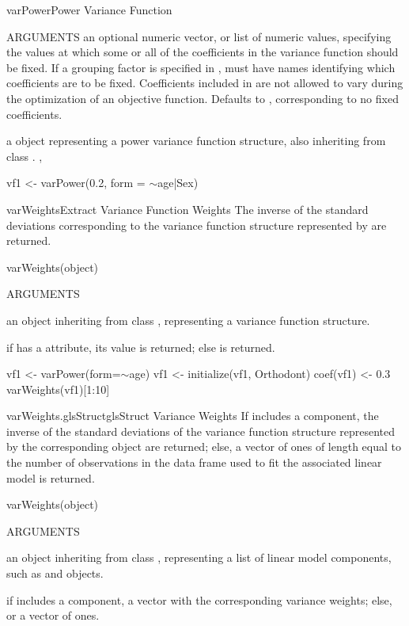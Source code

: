 \documentclass[pdftex]{article} \usepackage{url,graphicx}
\renewcommand{\Twiddle}{\mbox{\(\sim\)}}
\begin{document}
\begin{Helpfile}{varPower}{Power Variance Function}
\begin{Argument}{ARGUMENTS}
an optional numeric vector, or list of numeric values,
specifying the values at which some or all of the  coefficients in
the variance function should be fixed. If a grouping factor is
specified in ,  must have names identifying
which coefficients are to be fixed. Coefficients included in
 are not allowed to vary during the optimization of an
objective function. Defaults to , corresponding to no
fixed coefficients.
\end{Argument}
a  object representing a power variance function
structure, also inheriting from class .
, 
\need 15pt
\vspace{-16pt} 
\begin{Example}
vf1 <- varPower(0.2, form = \Twiddle age|Sex)
\end{Example}
\end{Helpfile}
\begin{Helpfile}{varWeights}{Extract Variance Function Weights}
The inverse of the standard deviations corresponding to the variance
function structure represented by  are returned.
\begin{Example}
varWeights(object)
\end{Example}
\begin{Argument}{ARGUMENTS}
\item[\Co{object:}]
an object inheriting from class ,
representing a variance function structure.
\end{Argument}
if  has a  attribute, its value is
returned; else  is returned.
\need 15pt
\vspace{-16pt} 
\begin{Example}
vf1 <- varPower(form=\Twiddle age)
vf1 <- initialize(vf1, Orthodont)
coef(vf1) <- 0.3
varWeights(vf1)[1:10]
\end{Example}
\end{Helpfile}
\begin{Helpfile}{varWeights.glsStruct}{glsStruct Variance Weights}
If  includes a  component, the inverse of
the standard deviations of the variance function structure represented
by the corresponding  object are returned; else, a
vector of ones of length equal to the number of observations in the
data frame used to fit the associated linear model is returned.
\begin{Example}
varWeights(object)
\end{Example}
\begin{Argument}{ARGUMENTS}
\item[\Co{object:}]
an object inheriting from class ,
representing a list of linear model components, such as
 and  objects.
\end{Argument}
if  includes a  component, a vector with
the corresponding variance weights; else, or a vector of ones.
\end{Helpfile}
\end{document}
